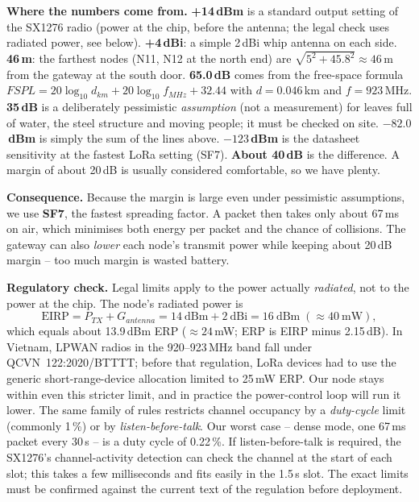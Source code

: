 \documentclass[11pt,a4paper]{report}
\newcommand{\why}[1]{\par\noindent\colorbox{gray!10}{\parbox{\dimexpr\linewidth-2\fboxsep}{\small\textbf{Where the numbers come from.} #1}}\par}
\begin{document}
\why{
\textbf{+14\,dBm} is a standard output setting of the SX1276 radio (power at the chip, before the antenna; the legal check uses radiated power, see below).
\textbf{+4\,dBi}: a simple 2\,dBi whip antenna on each side.
\textbf{46\,m}: the farthest nodes (N11, N12 at the north end) are $\sqrt{5^2 + 45.8^2} \approx 46$\,m from the gateway at the south door.
\textbf{65.0\,dB} comes from the free-space formula $FSPL = 20\log_{10} d_{km} + 20\log_{10} f_{MHz} + 32.44$ with $d = 0.046$\,km and $f = 923$\,MHz.
\textbf{35\,dB} is a deliberately pessimistic \emph{assumption} (not a measurement) for leaves full of water, the steel structure and moving people; it must be checked on site.
\textbf{$-82.0$\,dBm} is simply the sum of the lines above.
\textbf{$-123$\,dBm} is the datasheet sensitivity at the fastest LoRa setting (SF7).
\textbf{About 40\,dB} is the difference. A margin of about 20\,dB is usually considered comfortable, so we have plenty.
}

\textbf{Consequence.} Because the margin is large even under pessimistic assumptions, we use \textbf{SF7}, the fastest spreading factor. A packet then takes only about 67\,ms on air, which minimises both energy per packet and the chance of collisions. The gateway can also \emph{lower} each node's transmit power while keeping about 20\,dB margin -- too much margin is wasted battery.

\textbf{Regulatory check.} Legal limits apply to the power actually \emph{radiated}, not to the power at the chip. The node's radiated power is
\begin{equation}
  \text{EIRP} = P_{TX} + G_{antenna} = 14\ \text{dBm} + 2\ \text{dBi} = 16\ \text{dBm} \;(\approx 40\ \text{mW}),
\end{equation}
which equals about 13.9\,dBm ERP ($\approx 24$\,mW; ERP is EIRP minus 2.15\,dB). In Vietnam, LPWAN radios in the 920--923\,MHz band fall under QCVN~122:2020/BTTTT; before that regulation, LoRa devices had to use the generic short-range-device allocation limited to 25\,mW ERP. Our node stays within even this stricter limit, and in practice the power-control loop will run it lower. The same family of rules restricts channel occupancy by a \emph{duty-cycle} limit (commonly 1\,\%) or by \emph{listen-before-talk}. Our worst case -- dense mode, one 67\,ms packet every 30\,s -- is a duty cycle of 0.22\,\%. If listen-before-talk is required, the SX1276's channel-activity detection can check the channel at the start of each slot; this takes a few milliseconds and fits easily in the 1.5\,s slot. The exact limits must be confirmed against the current text of the regulation before deployment.
\end{document}
